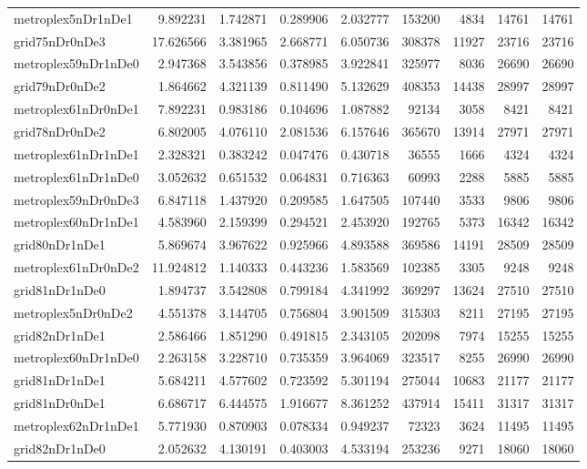 \begin{longtable}{|l|r|r|r|r|r|r|r|r|}
metroplex5nDr1nDe1 & 9.892231 & 1.742871 & 0.289906 & 2.032777 & 153200 & 4834 & 14761 & 14761 \\
grid75nDr0nDe3 & 17.626566 & 3.381965 & 2.668771 & 6.050736 & 308378 & 11927 & 23716 & 23716 \\
metroplex59nDr1nDe0 & 2.947368 & 3.543856 & 0.378985 & 3.922841 & 325977 & 8036 & 26690 & 26690 \\
grid79nDr0nDe2 & 1.864662 & 4.321139 & 0.811490 & 5.132629 & 408353 & 14438 & 28997 & 28997 \\
metroplex61nDr0nDe1 & 7.892231 & 0.983186 & 0.104696 & 1.087882 & 92134 & 3058 & 8421 & 8421 \\
grid78nDr0nDe2 & 6.802005 & 4.076110 & 2.081536 & 6.157646 & 365670 & 13914 & 27971 & 27971 \\
metroplex61nDr1nDe1 & 2.328321 & 0.383242 & 0.047476 & 0.430718 & 36555 & 1666 & 4324 & 4324 \\
metroplex61nDr1nDe0 & 3.052632 & 0.651532 & 0.064831 & 0.716363 & 60993 & 2288 & 5885 & 5885 \\
metroplex59nDr0nDe3 & 6.847118 & 1.437920 & 0.209585 & 1.647505 & 107440 & 3533 & 9806 & 9806 \\
metroplex60nDr1nDe1 & 4.583960 & 2.159399 & 0.294521 & 2.453920 & 192765 & 5373 & 16342 & 16342 \\
grid80nDr1nDe1 & 5.869674 & 3.967622 & 0.925966 & 4.893588 & 369586 & 14191 & 28509 & 28509 \\
metroplex61nDr0nDe2 & 11.924812 & 1.140333 & 0.443236 & 1.583569 & 102385 & 3305 & 9248 & 9248 \\
grid81nDr1nDe0 & 1.894737 & 3.542808 & 0.799184 & 4.341992 & 369297 & 13624 & 27510 & 27510 \\
metroplex5nDr0nDe2 & 4.551378 & 3.144705 & 0.756804 & 3.901509 & 315303 & 8211 & 27195 & 27195 \\
grid82nDr1nDe1 & 2.586466 & 1.851290 & 0.491815 & 2.343105 & 202098 & 7974 & 15255 & 15255 \\
metroplex60nDr1nDe0 & 2.263158 & 3.228710 & 0.735359 & 3.964069 & 323517 & 8255 & 26990 & 26990 \\
grid81nDr1nDe1 & 5.684211 & 4.577602 & 0.723592 & 5.301194 & 275044 & 10683 & 21177 & 21177 \\
grid81nDr0nDe1 & 6.686717 & 6.444575 & 1.916677 & 8.361252 & 437914 & 15411 & 31317 & 31317 \\
metroplex62nDr1nDe1 & 5.771930 & 0.870903 & 0.078334 & 0.949237 & 72323 & 3624 & 11495 & 11495 \\
grid82nDr1nDe0 & 2.052632 & 4.130191 & 0.403003 & 4.533194 & 253236 & 9271 & 18060 & 18060 \\

\end{longtable}
